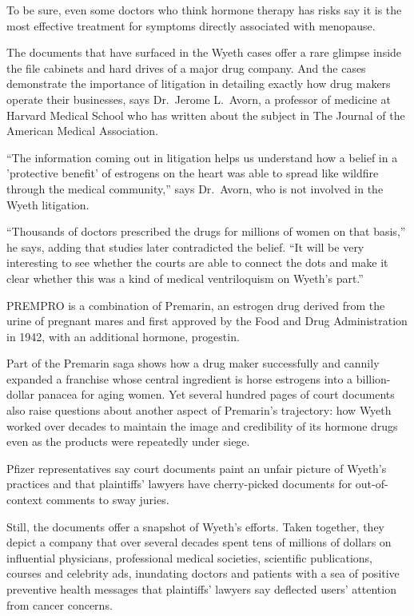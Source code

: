 ﻿\documentclass[12pt]{article}
\begin{document}
To be sure, even some doctors who think hormone therapy has risks say it is the most effective
treatment for symptoms directly associated with menopause.

The documents that have surfaced in the Wyeth cases offer a rare glimpse inside the file cabinets
and hard drives of a major drug company. And the cases demonstrate the importance of litigation in
detailing exactly how drug makers operate their businesses, says Dr.~Jerome L.~Avorn, a professor of
medicine at Harvard Medical School who has written about the subject in The Journal of the American
Medical Association.

``The information coming out in litigation helps us understand how a belief in a 'protective
benefit' of estrogens on the heart was able to spread like wildfire through the medical community,''
says Dr.~Avorn, who is not involved in the Wyeth litigation.

``Thousands of doctors prescribed the drugs for millions of women on that basis,'' he says, adding
that studies later contradicted the belief. ``It will be very interesting to see whether the courts
are able to connect the dots and make it clear whether this was a kind of medical ventriloquism on
Wyeth's part.''

PREMPRO is a combination of Premarin, an estrogen drug derived from the urine of pregnant mares and
first approved by the Food and Drug Administration in 1942, with an additional hormone, progestin.

Part of the Premarin saga shows how a drug maker successfully and cannily expanded a franchise whose
central ingredient is horse estrogens into a billion-dollar panacea for aging women. Yet several
hundred pages of court documents also raise questions about another aspect of Premarin's trajectory:
how Wyeth worked over decades to maintain the image and credibility of its hormone drugs even as the
products were repeatedly under siege.

Pfizer representatives say court documents paint an unfair picture of Wyeth's practices and that
plaintiffs' lawyers have cherry-picked documents for out-of-context comments to sway juries.

Still, the documents offer a snapshot of Wyeth's efforts. Taken together, they depict a company that
over several decades spent tens of millions of dollars on influential physicians, professional
medical societies, scientific publications, courses and celebrity ads, inundating doctors and
patients with a sea of positive preventive health messages that plaintiffs' lawyers say deflected
users' attention from cancer concerns.
\end{document}
